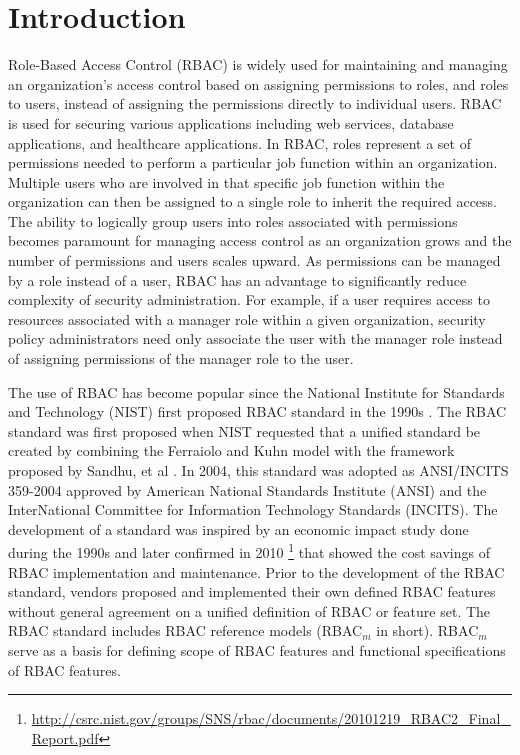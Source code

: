 \section{Introduction} \label{sec:introduction}

Role-Based Access Control (RBAC) is widely used for maintaining and managing an organization's 
access control based on assigning permissions to roles, and roles to users, instead of 
assigning the permissions directly to individual users.
RBAC is used for securing 
various applications including web services, database applications, and healthcare applications. 
In RBAC, roles represent a set of permissions needed to perform a particular job function within an organization.  
Multiple users who are involved in that specific job function within the organization can then be 
assigned to a single role to inherit the required access. 
The ability to logically group users into roles associated with permissions becomes paramount for managing access control as an organization grows
and the number of permissions and users scales upward.
As permissions can be managed by a role instead of a user, RBAC has an advantage to significantly reduce complexity of security
administration.
For example, if a user requires access to resources 
associated with a manager role within a given organization, security policy administrators need only associate the user with the manager role instead
of assigning permissions of the manager role to the user.


The use of RBAC has become popular since the National Institute for Standards and Technology (NIST) 
first proposed RBAC standard in the 1990s \cite{o20102010}.
The RBAC standard was first proposed when NIST 
requested that a unified standard be created by combining the Ferraiolo and Kuhn model \cite{ferraiolokuhn} with the framework 
proposed by Sandhu, et al \cite{sandhu1996role}.  
In 2004, this standard was adopted as ANSI/INCITS 359-2004 approved by American National Standards Institute (ANSI) and the InterNational Committee for Information Technology Standards (INCITS). 
The development of a standard was inspired by an economic impact study done during the 1990s and later confirmed in 2010 \footnote{\url{http://csrc.nist.gov/groups/SNS/rbac/documents/20101219_RBAC2_Final_Report.pdf}} that showed the cost savings of RBAC implementation and maintenance. 
Prior to the development of the RBAC standard, vendors proposed and implemented their own defined RBAC features without general agreement on a unified definition of RBAC or feature set. The RBAC standard includes RBAC reference models (RBAC$_{m}$ in short). RBAC$_{m}$ serve as a basis for defining scope of RBAC features and functional specifications of RBAC features.

